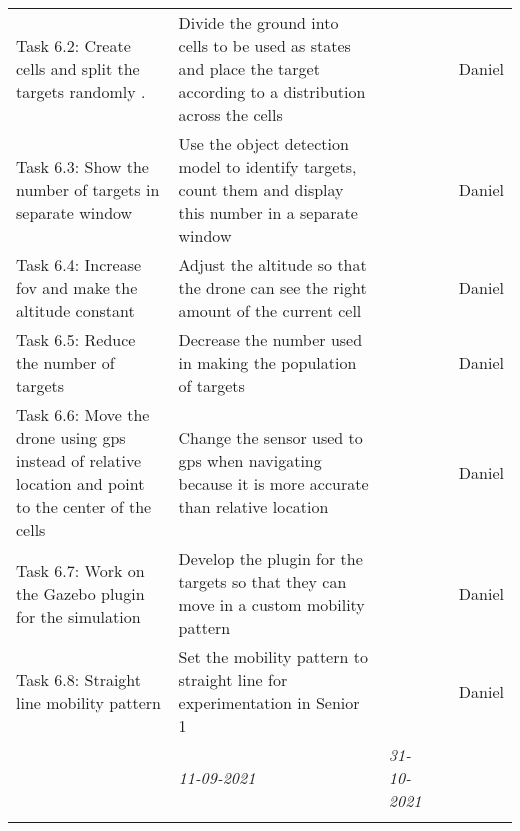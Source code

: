 \begin{center}
\begin{small}
\begin{xltabular}{\textwidth}{ p{3cm} p{5cm} X X c }
            Task 6.2: Create cells and split the targets 
            randomly . 
            & Divide the ground into cells to be used
            as states and place the target according to
                a distribution across the cells & & & Daniel \\

            Task 6.3: Show the number of targets in separate 
            window
                & Use the object detection model to
                identify targets, count them and display
                this number in a separate window 
                & & & Daniel \\

            Task 6.4: Increase \gls{fov} and make the 
            altitude constant 
                & Adjust the altitude so that the drone
                can see the right amount of the current 
                cell & & & Daniel \\

            Task 6.5: Reduce the number of targets
                & Decrease the number used in making the
                population of targets & & & Daniel \\
                
            Task 6.6: Move the drone using \gls{gps}   
            instead of relative location and point to the 
            center of the cells
                & Change the sensor used to 
                \gls{gps} when navigating because it is 
                more accurate than relative location
                & & & Daniel \\

            Task 6.7: Work on the Gazebo plugin for the 
            simulation
                & Develop the plugin for the targets
                so that they can move in a custom 
                mobility pattern & & & Daniel \\

            Task 6.8: Straight line mobility pattern
                & Set the mobility pattern to straight line
                for experimentation in Senior 1 & & & Daniel \\

            \addlinespace
                & \emph{11-09-2021} & \emph{31-10-2021} & 
            \\ \addlinespace


\end{xltabular}
\end{small}
\end{center}
